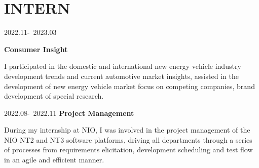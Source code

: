 \documentclass{resume}
\begin{document}

\section{INTERN}

{2022.11-\ 2023.03}

  \textbf{Consumer Insight}\par I participated in the domestic and international new energy vehicle industry development trends and current automotive market insights, assisted in the development of new energy vehicle market focus on competing companies, brand development of special research.


{2022.08-\ 2022.11}
 \textbf{Project Management}\par  During my internship at NIO, I was involved in the project management of the NIO NT2 and NT3 software platforms, driving all departments through a series of processes from requirements elicitation, development scheduling and test flow in an agile and efficient manner.



\end{document}
